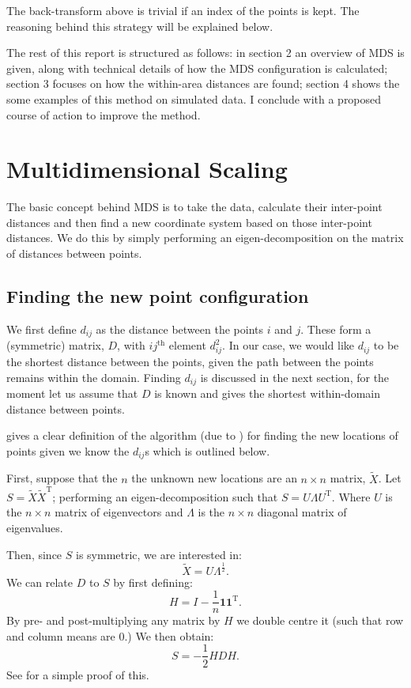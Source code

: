 \documentclass[a4paper,10pt]{article}
\newcommand{\tr}[1]{#1^{\text{T}}}
\newcommand{\cross}{\times}
\begin{document}
The back-transform above is trivial if an index of the points is kept. The reasoning behind this strategy will be explained below.

The rest of this report is structured as follows: in section 2 an overview of MDS is given, along with technical details of how the MDS configuration is calculated; section 3 focuses on how the within-area distances are found; section 4 shows the some examples of this method on simulated data. I conclude with a proposed course of action to improve the method.

\section{Multidimensional Scaling}

The basic concept behind MDS is to take the data, calculate their inter-point distances and then find a new coordinate system based on those inter-point distances. We do this by simply performing an eigen-decomposition on the matrix of distances between points.

\subsection{Finding the new point configuration}

We first define $d_{ij}$ as the distance between the points $i$ and $j$. These form a (symmetric) matrix, $D$, with $ij^{\text{th}}$ element $d^2_{ij}$. In our case, we would like $d_{ij}$ to be the shortest distance between the points, given the path between the points remains within the domain. Finding $d_{ij}$ is discussed in the next section, for the moment let us assume that $D$ is known and gives the shortest within-domain distance between points.

\cite{diaconis08} gives a clear definition of the algorithm (due to \cite{schoenberg35}) for finding the new locations of points given we know the $d_{ij}$s which is outlined below.

First, suppose that the $n$ the unknown new locations are an $n \times n$ matrix, $\tilde{X}$. Let $S=\tilde{X}\tr{\tilde{X}}$; performing an eigen-decomposition such that $S=U\Lambda\tr{U}$. Where $U$ is the $n \cross n$ matrix of eigenvectors and $\Lambda$ is the $n \cross n$ diagonal matrix of eigenvalues.

Then, since $S$ is symmetric, we are interested in:
\begin{equation}
\tilde{X}=U\Lambda^{\frac{1}{2}}.
\end{equation}
We can relate $D$ to $S$ by first defining:
\begin{equation}
H = I-\frac{1}{n}\mathbf{1}\tr{\mathbf{1}}.
\end{equation}
By pre- and post-multiplying any matrix by $H$ we double centre it (such that row and column means are 0.) We then obtain:
\begin{equation}
S = -\frac{1}{2}HDH.
\end{equation}
See \cite{diaconis08} for a simple proof of this.
\end{document}
